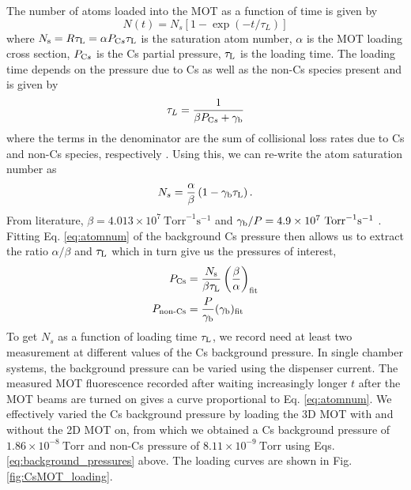 The number of atoms loaded into the MOT as a function of time is given by
\begin{equation}\label{eq:atomnum}
N(t)=N_s\left[1-\exp \left(-t / \tau_L\right)\right]
\end{equation}
where $N_{\text s}=R \tau_{\text L}=\alpha P_{\text Cs} \tau_{\text L}$ is the saturation atom number, $\alpha$ is the MOT loading cross section, $P_{\text Cs}$ is the Cs partial pressure, $\tau_{\text L}$ is the loading time. The loading time depends on the pressure due to Cs as well as the non-Cs species present and is given by
\begin{equation}
\tau_L=\frac{1}{\beta P_{\text Cs}+\gamma_{\text b}}
\end{equation}
where the terms in the denominator are the sum of collisional loss rates due to Cs and non-Cs species, respectively \cite{RRCAT2020}. Using this, we can re-write the atom saturation number as 
\begin{equation}
N_s=\frac{\alpha}{\beta}\left(1-\gamma_{\text b} \tau_{\text L}\right).
\end{equation}
From literature, $\beta=4.013\times10^7 ~\text{Torr}^{-1} \text{s}^{-1}$ and $\gamma_{\text b}/P=4.9\times10^7 ~\text{Torr}^{-1} \text{s}^{-1}$ \cite{Arnthorp2012}. Fitting Eq. \ref{eq:atomnum} of the background Cs pressure then allows us to extract the ratio $\alpha/\beta$ and $\tau_{\text L}$ which in turn give us the pressures of interest, 
\begin{equation}\label{eq:background_pressures}
\begin{aligned}
    P_{\text {Cs}} &= \frac{N_{\text s}}{\beta \tau_{\text L}}\left(\frac{\beta}{\alpha}\right)_{\text {fit}}\\
    P_{\text {non-Cs}} &= \frac{P}{\gamma_{\text b}}(\gamma_{\text b})_{\text{fit}}
\end{aligned}
\end{equation}
To get $N_s$ as a function of loading time $\tau_{\text L}$, we record need at least two measurement at different values of the Cs background pressure. In single chamber systems, the background pressure can be varied using the dispenser current. The measured MOT fluorescence recorded after waiting increasingly longer $t$ after the MOT beams are turned on gives a curve proportional to Eq. \ref{eq:atomnum}. We effectively varied the Cs background pressure by loading the 3D MOT with and without the 2D MOT on, from which we obtained a Cs background pressure of $1.86\times10^{-8} ~\text{Torr}$ and non-Cs pressure of $8.11\times10^{-9} ~\text{Torr}$ using Eqs.  \ref{eq:background_pressures} above. The loading curves are shown in Fig. \ref{fig:CsMOT_loading}.

